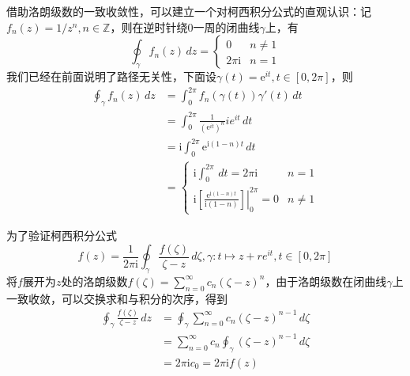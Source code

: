 \documentclass{ctexbook}
\newcommand{\evalat}[3]{\left.#1\right|_{#2}^{#3}}
\begin{document}
借助洛朗级数的一致收敛性，可以建立一个对柯西积分公式的直观认识：记$f_n(z)=1/z^n,n\in\mathbb{Z}$，则在逆时针绕0一周的闭曲线$\gamma$上，有
\[\oint_{\gamma}f_n(z)\,dz=\begin{cases}0&n\neq 1\\2\pi \mathrm{i}&n=1\end{cases}\]
我们已经在前面说明了路径无关性，下面设$\gamma(t)=\mathrm{e}^{it},t\in[0,2\pi]$，则
\begin{align*}
    \oint_{\gamma}f_n(z)\,dz&=\int_0^{2\pi}f_n(\gamma(t))\gamma'(t)\,dt\\
    &=\int_0^{2\pi}\frac{1}{(\mathrm{e}^{it})^n} ie^{it}\,dt\\
    &=\mathrm{i}\int_0^{2\pi}\mathrm{e}^{\mathrm{i}(1-n)t}\,dt\\
    &=\begin{cases}
        \mathrm{i}\int_0^{2\pi}\,dt=2\pi \mathrm{i}&n=1\\
        \mathrm{i}\evalat{\left[\frac{\mathrm{e}^{\mathrm{i}(1-n)t}}{\mathrm{i}(1-n)}\right]}{0}{2\pi}=0&n\neq 1
    \end{cases}
\end{align*}

为了验证柯西积分公式
\[f(z)=\frac{1}{2\pi \mathrm{i}}\oint_{\gamma}\frac{f(\zeta)}{\zeta-z}\,d\zeta,\gamma:t\mapsto z+re^{it},t\in[0,2\pi]\]将$f$展开为$z$处的洛朗级数$f(\zeta)=\sum_{n=0}^{\infty}c_n (\zeta-z)^n$，由于洛朗级数在闭曲线$\gamma$上一致收敛，可以交换求和与积分的次序，得到
\begin{align*}
    \oint_{\gamma}\frac{f(\zeta)}{\zeta-z}\,dz&=\oint_{\gamma}\sum_{n=0}^{\infty}c_n (\zeta-z)^{n-1}\,d\zeta\\
    &=\sum_{n=0}^{\infty}c_n\oint_{\gamma}(\zeta-z)^{n-1}\,d\zeta\\
    &=2\pi \mathrm{i} c_0=2\pi \mathrm{i} f(z)
\end{align*}
\end{document}

